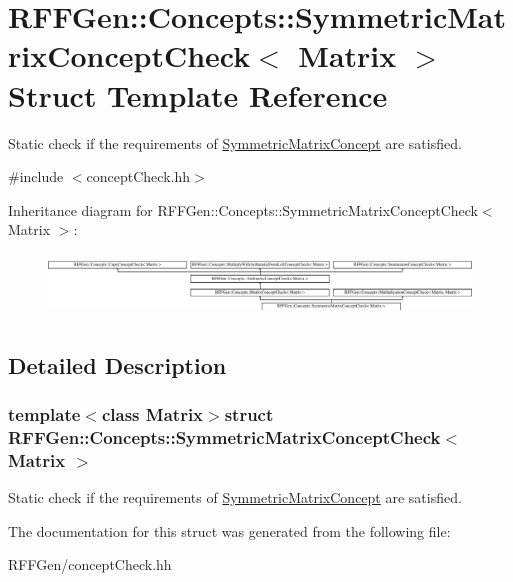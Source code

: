 \hypertarget{structRFFGen_1_1Concepts_1_1SymmetricMatrixConceptCheck}{\section{R\-F\-F\-Gen\-:\-:Concepts\-:\-:Symmetric\-Matrix\-Concept\-Check$<$ Matrix $>$ Struct Template Reference}
\label{structRFFGen_1_1Concepts_1_1SymmetricMatrixConceptCheck}
}


Static check if the requirements of \hyperlink{structRFFGen_1_1Concepts_1_1SymmetricMatrixConcept}{Symmetric\-Matrix\-Concept} are satisfied.  




{\ttfamily \#include $<$concept\-Check.\-hh$>$}

Inheritance diagram for R\-F\-F\-Gen\-:\-:Concepts\-:\-:Symmetric\-Matrix\-Concept\-Check$<$ Matrix $>$\-:\begin{figure}[H]
\begin{center}
\leavevmode
\includegraphics[height=1.666667cm]{structRFFGen_1_1Concepts_1_1SymmetricMatrixConceptCheck}
\end{center}
\end{figure}


\subsection{Detailed Description}
\subsubsection*{template$<$class Matrix$>$struct R\-F\-F\-Gen\-::\-Concepts\-::\-Symmetric\-Matrix\-Concept\-Check$<$ Matrix $>$}

Static check if the requirements of \hyperlink{structRFFGen_1_1Concepts_1_1SymmetricMatrixConcept}{Symmetric\-Matrix\-Concept} are satisfied. 

The documentation for this struct was generated from the following file\-:\begin{DoxyCompactItemize}
\item 
R\-F\-F\-Gen/concept\-Check.\-hh\end{DoxyCompactItemize}

